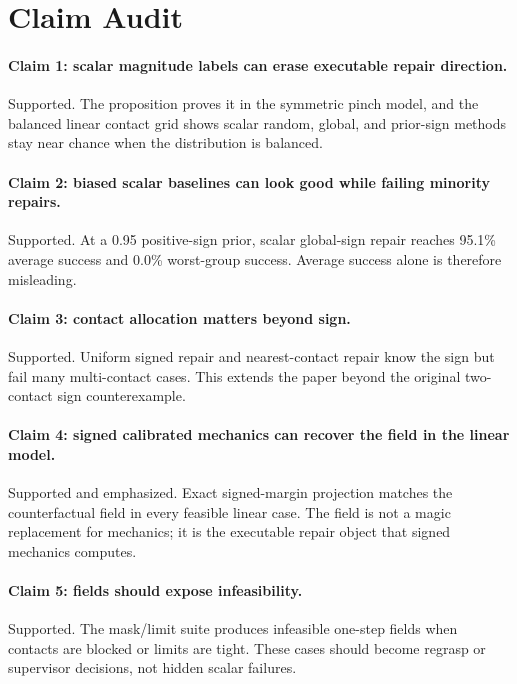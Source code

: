 \documentclass{article}
\begin{document}
\section{Claim Audit}

\paragraph{Claim 1: scalar magnitude labels can erase executable repair direction.}
Supported. The proposition proves it in the symmetric pinch model, and the balanced linear contact grid shows scalar random, global, and prior-sign methods stay near chance when the distribution is balanced.

\paragraph{Claim 2: biased scalar baselines can look good while failing minority repairs.}
Supported. At a 0.95 positive-sign prior, scalar global-sign repair reaches 95.1\% average success and 0.0\% worst-group success. Average success alone is therefore misleading.

\paragraph{Claim 3: contact allocation matters beyond sign.}
Supported. Uniform signed repair and nearest-contact repair know the sign but fail many multi-contact cases. This extends the paper beyond the original two-contact sign counterexample.

\paragraph{Claim 4: signed calibrated mechanics can recover the field in the linear model.}
Supported and emphasized. Exact signed-margin projection matches the counterfactual field in every feasible linear case. The field is not a magic replacement for mechanics; it is the executable repair object that signed mechanics computes.

\paragraph{Claim 5: fields should expose infeasibility.}
Supported. The mask/limit suite produces infeasible one-step fields when contacts are blocked or limits are tight. These cases should become regrasp or supervisor decisions, not hidden scalar failures.
\end{document}
